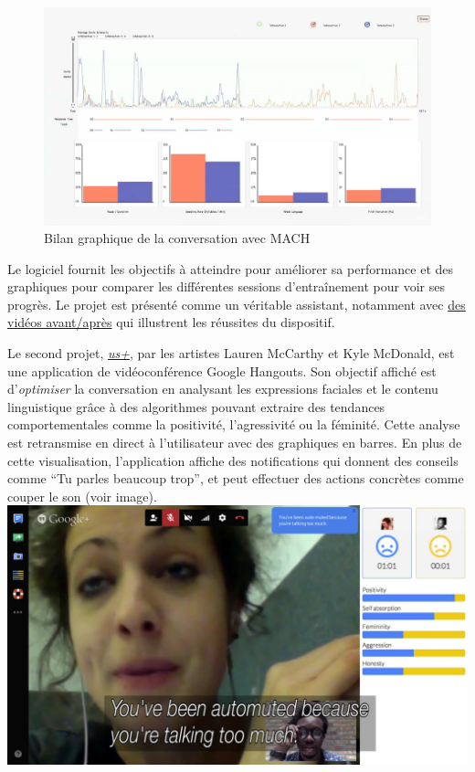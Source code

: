 \documentclass[]{article}
\begin{document}
\begin{figure}
\centering
\includegraphics{./tex2pdf.2952/937a65ba1d59e1bc663dab9688f6eb90b7fa9024.png}
\caption{Bilan graphique de la conversation avec MACH}
\end{figure}

Le logiciel fournit les objectifs à atteindre pour améliorer sa
performance et des graphiques pour comparer les différentes sessions
d'entraînement pour voir ses progrès. Le projet est présenté comme un
véritable assistant, notamment avec
\href{https://www.youtube.com/watch?v=CHVNOiCT8vA}{des vidéos
avant/après} qui illustrent les réussites du dispositif.

Le second projet, \href{http://lauren-mccarthy.com/us}{\emph{us+}}, par
les artistes Lauren McCarthy et Kyle McDonald, est une application de
vidéoconférence Google Hangouts. Son objectif affiché est
d'\emph{optimiser} la conversation en analysant les expressions faciales
et le contenu linguistique grâce à des algorithmes pouvant extraire des
tendances comportementales comme la positivité, l'agressivité ou la
féminité. Cette analyse est retransmise en direct à l'utilisateur avec
des graphiques en barres. En plus de cette visualisation, l'application
affiche des notifications qui donnent des conseils comme ``Tu parles
beaucoup trop'', et peut effectuer des actions concrètes comme couper le
son (voir image).
\includegraphics{./tex2pdf.2952/8a1224117ed91d8015226843bec5d97f13330fe4.jpg}
\end{document}

